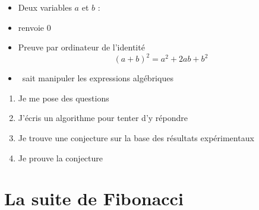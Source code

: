 \begin{frame}


\pause

\begin{itemize}
  \item Deux variables $a$ et $b$ : 
  \pause
  \item {} renvoie $0$
  \pause
  \item Preuve par ordinateur de l'identité $$(a+b)^2 = a^2+2ab+b^2$$
  \pause
  \item \Sage\ sait manipuler les expressions algébriques
\end{itemize}

\bigskip
\pause

\pause

\begin{enumerate}
  \item Je me pose des questions
  \pause
  \item J'écris un algorithme pour tenter d'y répondre
  \pause
  \item Je trouve une conjecture sur la base des résultats expérimentaux
  \pause
  \item Je prouve la conjecture
\end{enumerate}
\end{frame}

\section{La suite de Fibonacci}

